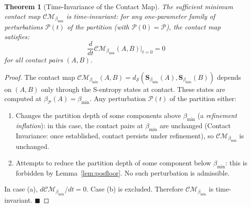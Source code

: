 \documentclass[11pt,twocolumn,a4paper]{article}
\theoremstyle{plain}
\newtheorem{theorem}{Theorem}[section]
\theoremstyle{definition}
\theoremstyle{remark}
\newcommand{\bmin}{\beta_{\min}}
\newcommand{\CM}{\mathcal{CM}}
\newcommand{\dS}{d_{\mathcal{S}}}
\newcommand{\Pcal}{\mathcal{P}}
\renewcommand{\qed}{\hfill$\blacksquare$}
\begin{document}
\begin{theorem}[Time-Invariance of the Contact Map]
\label{thm:time_invariance}
The sufficient minimum contact map $\CM_{\bmin}$ is time-invariant: for any
one-parameter family of perturbations $\Pcal(t)$ of the partition (with
$\Pcal(0) = \Pcal$), the contact map satisfies:
\[
  \frac{d}{dt}\CM_{\bmin}(A,B)\big|_{t=0} = 0
\]
for all contact pairs $(A,B)$.
\end{theorem}

\begin{proof}
The contact map $\CM_{\bmin}(A,B) = \dS(\mathbf{S}_{\bmin}(A), \mathbf{S}_{\bmin}(B))$
depends on $(A,B)$ only through the S-entropy states at contact. These states
are computed at $\beta_\Pcal(A) = \bmin$. Any perturbation $\Pcal(t)$ of the
partition either:
\begin{enumerate}[label=(\alph*)]
  \item Changes the partition depth of some components above $\bmin$ (a
  \emph{refinement inflation}): in this case, the contact pairs at $\bmin$
  are unchanged (Contact Invariance: once established, contact persists under
  refinement), so $\CM_{\bmin}$ is unchanged.
  \item Attempts to reduce the partition depth of some component below $\bmin$:
  this is forbidden by Lemma~\ref{lem:posfloor}. No such perturbation is
  admissible.
\end{enumerate}
In case (a), $d\CM_{\bmin}/dt = 0$. Case (b) is excluded. Therefore
$\CM_{\bmin}$ is time-invariant. \qed
\end{proof}
\end{document}
